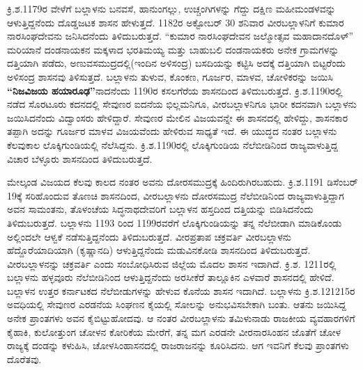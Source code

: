 ಕ್ರಿ.ಶ.1179ರ ವೇಳೆಗೆ ಬಲ್ಲಾಳನು ಬನವಸೆ, ಹಾನುಂಗಲ್ಲು, ಉಚ್ಚಂಗಿಗಳನ್ನು ಗೆದ್ದು ದಕ್ಷಿಣ ಮಹೀಮಂಡಳವನ್ನು ಆಳುತ್ತಿದ್ದನೆಂದು ದೊಡ್ಡಜಟಕ ಶಾಸನ ಹೇಳುತ್ತದೆ. 1182ರ ಅಕ್ಟೋಬರ್​ 30 ಶನಿವಾರ ವೀರಬಲ್ಲಾಳನಿಗೆ ಕುಮಾರ ನಾರಸಿಂಘದೇವನು ಜನಿಸಿದನೆಂದು ತಿಳಿದುಬರುತ್ತದೆ. “ಕುಮಾರ ನಾರಸಿಂಘದೇವನ ಜಲ್ಮೋತ್ಸವ ಮಹಾದಾನದೊಳ್​” ಮರಿಯಾನೆ ದಂಡನಾಯಕನ ಮಕ್ಕಳಾದ ಭರತಿಮಯ್ಯ ಮತ್ತು ಬಾಹುಬಲಿ ದಂಡನಾಯಕರು ಅನೇಕ ಗ್ರಾಮಗಳನ್ನು ದತ್ತಿಯಾಗಿ ಪಡೆದು, ಅಣುವಸಮುದ್ರದಲ್ಲಿ(ಇಂದಿನ ಅಳಿಸಂದ್ರ) ಬಸದಿಯನ್ನು ಕಟ್ಟಿಸಿ ಅದಕ್ಕೆ ದತ್ತಿಯಾಗಿ ಬಿಟ್ಟರೆಂದು ಅಳಿಸಂದ್ರ ಶಾಸನವು ತಿಳಿಸುತ್ತದೆ. ಬಲ್ಲಾಳನು ತುಳುವ, ಕೊಂಕಣ, ಗೂರ್ಜರ, ಮಾಳವ, ಚೋಳಿಕರನ್ನು ಜಯಿಸಿ \textbf{“ನಿಜವಿಜಯ ಹಯಾರೂಢ”}ನಾದನೆಂದು 1190ರ ಕಸಲಗೆರೆಯ ಶಾಸನದಿಂದ ತಿಳಿದುಬರುತ್ತದೆ. ಕ್ರಿ.ಶ.1190ರಲ್ಲಿ ನಡೆದ ಸೊರಟೂರು ಕದನದಲ್ಲಿ ಸೇವುಣರ ಐದನೆಯ ಭಿಲ್ಲಮನಿಗೂ, ವೀರಬಲ್ಲಾಳನಿಗೂ ಭಾರೀ ಕದನವಾಗಿ ಬಲ್ಲಾಳನು ಜಯಿಸಿದನೆಂದು ವಿದ್ವಾಂಸರು ಹೇಳಿದ್ದಾರೆ. ಸೇವುಣರ ಮೇಲಿನ ವಿಜಯವನ್ನೇ ಈ ಶಾಸನದಲ್ಲಿ ಹೇಳಿದ್ದು, ಶಾಸನಕಾರ ತಪ್ಪಾಗಿ ಅದನ್ನು ಗೂರ್ಜರ ಮಾಳವ ವಿಜಯವೆಂದು ಹೇಳಿರುವ ಸಾಧ್ಯತೆ ಇದೆ. ಈ ಯುದ್ಧದ ನಂತರ ಬಲ್ಲಾಳನು ಕೆಲವುಕಾಲ ಲೊಕ್ಕಿಗುಂಡಿಯಲ್ಲಿ ನೆಲೆಸಿದ್ದನು. ಕ್ರಿ.ಶ.1190ರಲ್ಲಿ ಲೊಕ್ಕಿಗುಂಡಿಯ ನೆಲೆಬೀಡಿನಿಂದ ರಾಜ್ಯವಾಳುತ್ತಿದ್ದ ವಿಚಾರ ಬೆಳ್ಳೂರು ಶಾಸನದಿಂದ ತಿಳಿದುಬರುತ್ತದೆ.

ಮೇಲ್ಕಂಡ ವಿಜಯದ ಕೆಲವು ಕಾಲದ ನಂತರ ಅವನು ದೋರಸಮುದ್ರಕ್ಕೆ ಹಿಂದಿರುಗಿರಬಹುದು. ಕ್ರಿ.ಶ.1191 ಡಿಸೆಂಬರ್​ 19ಕ್ಕೆ ಸರಿಹೊಂದುವ ತೊಣಚಿ ಶಾಸನದಿಂದ, ವೀರಬಲ್ಲಾಳನು ದೋರಸಮುದ್ರ ನೆಲೆಬೀಡಿನಿಂದ ರಾಜ್ಯವಾಳುತ್ತಿದ್ದಾಗ ಅವನ ಸಾಮಂತನು, ತೊಳಂಚೆಯ ಸಿದ್ಧನಾಥದೇವರಿಗೆ ಬಲ್ಲಾಳನ ಹಸ್ತದಿಂದ ದತ್ತಿಯನ್ನು ಬಿಡಿಸಿದನೆಂದು ತಿಳಿದುಬರುತ್ತದೆ. ಬಲ್ಲಾಳನು 1193 ರಿಂದ 1199ರವರೆಗೆ ಲೊಕ್ಕಿಗುಂಡಿಯನ್ನು ತನ್ನ ನೆಲೆಬೀಡಾಗಿ ಮಾಡಿಕೊಂಡು ಅಲ್ಲಿಂದಲೇ ಆಳ್ವಕೆ ನಡೆಸುತ್ತಿದ್ದನೆಂದು ತಿಳಿದುಬರುತ್ತದೆ. ವೀರಪ್ರತಾಪ ಚಕ್ರವರ್ತಿ ವೀರಬಲ್ಲಾಳನು ಹೆದ್ದೊರೆಯಾದಿಯಾಗಿ (ಕೃಷ್ಣಾನದಿ) ಆಳುತ್ತಿದ್ದನೆಂದು ಮಡುವಿನಕೋಡಿ ಶಾಸನದಿಂದ ತಿಳಿದುಬರುತ್ತದೆ. ವೀರಬಲ್ಲಾಳನನ್ನು ಚಕ್ರವರ್ತಿ ಎಂದು ಸಂಬೋಧಿಸಿರುವ ಜಿಲ್ಲೆಯ ಮೊದಲ ಶಾಸನ ಇದಾಗಿದೆ. ಕ್ರಿ.ಶ. 1211ರಲ್ಲಿ ಬಲ್ಲಾಳನು ಹಳ್ಳವೂರು ನೆಲೆಬೀಡಿನಿಂದ ಆಳುತ್ತಿದ್ದನೆಂದು ಅರಸೀಕೆರೆ ತಾಲ್ಲೂಕಿನ ಎಳವಾರೆ ಶಾಸನದಲ್ಲಿ ಹೇಳಿದೆ. ಬಲ್ಲಾಳನ ಉತ್ತರ ಕರ್ನಾಟಕದ ನೆಲೆಬೀಡುಗಳನ್ನು ಹೇಳುವ ಕೊನೆಯ ಶಾಸನ ಇದಾಗಿದೆ. ಬಲ್ಲಾಳನು ಕ್ರಿ.ಶ.1212\enginline{-}15ರ ಅವಧಿಯಲ್ಲಿ ಸೇವುಣರ ಎರಡನೆಯ ಸಿಂಘಣನ ಕೈಯಲ್ಲಿ ಸೋಲನ್ನು ಅನುಭವಿಸಬೇಕಾಗಿ ಬಂತು. ಆತನು ಜಯಿಸಿದ್ದ ಅನೇಕ ಪ್ರಾಂತಗಳು ಅವನ ಕೈಬಿಟ್ಟುಹೋದವು. ಆ ನಂತರ ವೀರಬಲ್ಲಾಳನು ತಮಿಳುನಾಡು ರಾಜಕೀಯ ವ್ಯವಹಾರಗಳಿಗೆ ಕೈಹಾಕಿ, ಕುಲೋತ್ತುಂಗ ಚೋಳನ ಕೋರಿಕೆಯ ಮೇರೆಗೆ, ತನ್ನ ಮಗ ಎರಡನೇ ವೀರನಾರಸಿಂಹನ ಜೊತೆಗೆ ಚೋಳ ರಾಜ್ಯಕ್ಕೆ ದಂಡನ್ನು ಕಳುಹಿಸಿ, ಚೋಳಸಿಂಹಾಸನದಲ್ಲಿ ರಾಜರಾಜನನ್ನು ಕೂರಿಸಿದನು. ಆಗ ಇವನಿಗೆ ಕೆಲವು ಪ್ರಾಂತಗಳು ದೊರೆತವು.

